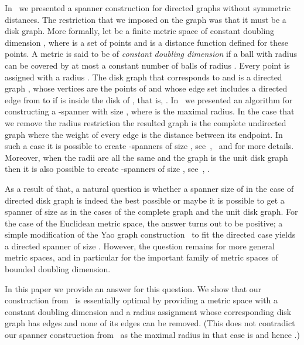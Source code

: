 \documentclass[proceedings]{stacs}
\theoremstyle{plain}\newtheorem{satz}[thm]{Satz}
\theoremstyle{definition}\newtheorem{crucial}[thm]{Crucial Definition}
\begin{document}
In~\cite{PeRo08} we presented a spanner construction for directed
graphs without symmetric distances. The restriction that we
imposed on the graph was that it must be a disk graph. More
formally, let  be a finite metric space of constant
doubling dimension , where  is a set of  points and
 is a distance function defined for these points. A metric
is said to be of {\em constant doubling dimension} if a ball with
radius  can be covered by at most a constant number of balls of
radius . Every point  is assigned with a radius
. The disk graph that corresponds to  and  is a
directed graph , whose vertices are the points of 
and whose edge set includes a directed edge from  to  if 
is inside the disk of , that is, .
In~\cite{PeRo08} we presented an algorithm for constructing a
-spanner with size , where  is
the maximal radius. In the case that we remove the radius
restriction the resulted graph is the complete undirected graph
where the weight of every edge is the distance between its
endpoint. In such a case it is possible to create
-spanners of size ,
see~\cite{HaMe06},~\cite{GaoGuiNgu04} and \cite{Ro07b} for more
details. Moreover, when the radii are all the same and the graph
is the unit disk graph then it is also possible to create
-spanners of size ,
see~\cite{gao05geometric}, \cite{PeRo08}.

As a result of that, a natural question is whether a spanner size
of  in the case of directed disk graph is
indeed the best possible or maybe it is possible to get a spanner
of size  as in the cases of the complete graph and
the unit disk graph. For the case of the Euclidean metric space,
the answer turns out to be positive; a simple modification of the
Yao graph construction~\cite{Yao82} to fit the directed case
yields a directed spanner of size . However, the
question remains for more general metric spaces, and in particular
for the important family of metric spaces of bounded doubling
dimension.

In this paper we provide an answer for this question. We show that
our construction from~\cite{PeRo08} is essentially optimal by
providing a metric space with a constant doubling dimension and a
radius assignment whose corresponding disk graph has 
edges and none of its edges can be removed. (This does not
contradict our spanner construction from~\cite{PeRo08} as the
maximal radius in that case is  and hence .)
\end{document}
